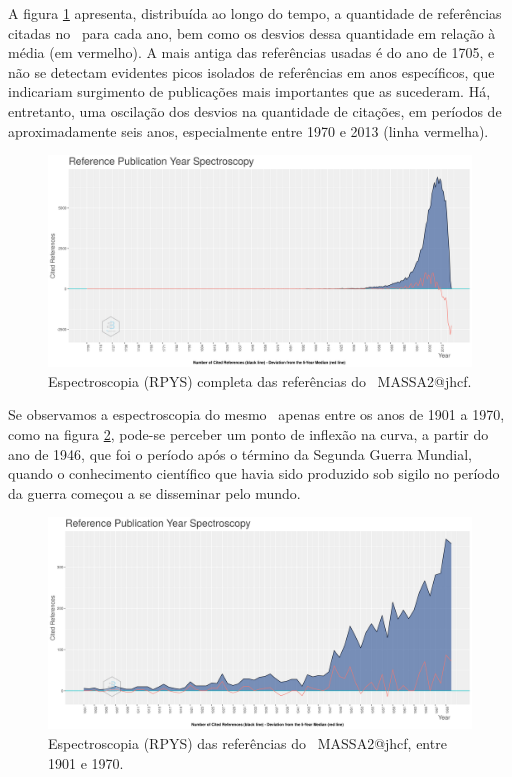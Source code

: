 A figura \ref{fig:MASSA2-ReferenceSpectroscopy} apresenta, distribuída ao longo do tempo, a quantidade de referências citadas no \dataset\, para cada ano, bem como os desvios dessa quantidade em relação à média (em vermelho). A mais antiga das referências usadas é do ano de 1705, e não se detectam evidentes picos isolados de referências em anos específicos, que indicariam surgimento de publicações mais importantes que as sucederam. Há, entretanto, uma oscilação dos desvios na quantidade de citações, em períodos de aproximadamente seis anos, especialmente entre 1970 e 2013 (linha vermelha).

\begin{figure}
    \centering
    \includegraphics[width=1\textwidth]{exploratory-data-analysis/jhcf/PesqBibliogr/SimulacaoMultiagente/WoS-20220203/Metricas/Documentos/MASSA2-ReferenceSpectroscopy.png}
    \caption{Espectroscopia (RPYS) completa das referências do \dataset\ MASSA2@jhcf.}
    \label{fig:MASSA2-ReferenceSpectroscopy}
\end{figure}

Se observamos a espectroscopia do mesmo \dataset\ apenas entre os anos de 1901 a 1970, como na figura \ref{fig:MASSA2-ReferenceSpectroscopy:1901:1970}, pode-se perceber um ponto de inflexão na curva, a partir do ano de 1946, que foi o período após o término da Segunda Guerra Mundial, quando o conhecimento científico que havia sido produzido sob sigilo no período da guerra começou a se disseminar pelo mundo.

\begin{figure}
    \centering
    \includegraphics[width=1\textwidth]{exploratory-data-analysis/jhcf/PesqBibliogr/SimulacaoMultiagente/WoS-20220203/Metricas/Documentos/MASSA2-ReferenceSpectroscopy-1901-1970.png}
    \caption{Espectroscopia (RPYS) das referências do \dataset\ MASSA2@jhcf, entre 1901 e 1970.}
    \label{fig:MASSA2-ReferenceSpectroscopy:1901:1970}
\end{figure}
    
